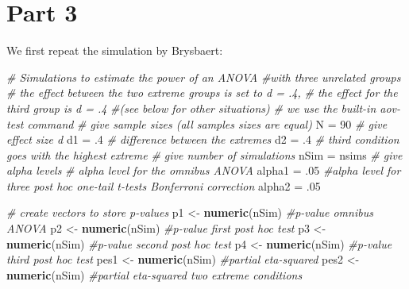 \documentclass[]{book}
\newenvironment{Shaded}{\begin{snugshade}}{\end{snugshade}}
\newcommand{\CommentTok}[1]{\textcolor[rgb]{0.56,0.35,0.01}{\textit{#1}}}
\newcommand{\DecValTok}[1]{\textcolor[rgb]{0.00,0.00,0.81}{#1}}
\newcommand{\FloatTok}[1]{\textcolor[rgb]{0.00,0.00,0.81}{#1}}
\newcommand{\KeywordTok}[1]{\textcolor[rgb]{0.13,0.29,0.53}{\textbf{#1}}}
\newcommand{\NormalTok}[1]{#1}
\newcommand{\StringTok}[1]{\textcolor[rgb]{0.31,0.60,0.02}{#1}}
\begin{document}
\hypertarget{part-3}{%
\section{Part 3}\label{part-3}}

We first repeat the simulation by Brysbaert:

\begin{Shaded}
\begin{Highlighting}[]
\CommentTok{# Simulations to estimate the power of an ANOVA }
\CommentTok{#with three unrelated groups}
\CommentTok{# the effect between the two extreme groups is set to d = .4, }
\CommentTok{# the effect for the third group is d = .4 }
\CommentTok{#(see below for other situations)}
\CommentTok{# we use the built-in aov-test command}
\CommentTok{# give sample sizes (all samples sizes are equal)}
\NormalTok{N =}\StringTok{ }\DecValTok{90}
\CommentTok{# give effect size d}
\NormalTok{d1 =}\StringTok{ }\FloatTok{.4} \CommentTok{# difference between the extremes}
\NormalTok{d2 =}\StringTok{ }\FloatTok{.4} \CommentTok{# third condition goes with the highest extreme}
\CommentTok{# give number of simulations}
\NormalTok{nSim =}\StringTok{ }\NormalTok{nsims}
\CommentTok{# give alpha levels}
\CommentTok{# alpha level for the omnibus ANOVA}
\NormalTok{alpha1 =}\StringTok{ }\FloatTok{.05} 
\CommentTok{#alpha level for three post hoc one-tail t-tests Bonferroni correction}
\NormalTok{alpha2 =}\StringTok{ }\FloatTok{.05} 
\end{Highlighting}
\end{Shaded}

\begin{Shaded}
\begin{Highlighting}[]
\CommentTok{# create vectors to store p-values}
\NormalTok{p1 <-}\StringTok{ }\KeywordTok{numeric}\NormalTok{(nSim) }\CommentTok{#p-value omnibus ANOVA}
\NormalTok{p2 <-}\StringTok{ }\KeywordTok{numeric}\NormalTok{(nSim) }\CommentTok{#p-value first post hoc test}
\NormalTok{p3 <-}\StringTok{ }\KeywordTok{numeric}\NormalTok{(nSim) }\CommentTok{#p-value second post hoc test}
\NormalTok{p4 <-}\StringTok{ }\KeywordTok{numeric}\NormalTok{(nSim) }\CommentTok{#p-value third post hoc test}
\NormalTok{pes1 <-}\StringTok{ }\KeywordTok{numeric}\NormalTok{(nSim) }\CommentTok{#partial eta-squared}
\NormalTok{pes2 <-}\StringTok{ }\KeywordTok{numeric}\NormalTok{(nSim) }\CommentTok{#partial eta-squared two extreme conditions}
\end{Highlighting}
\end{Shaded}
\end{document}
